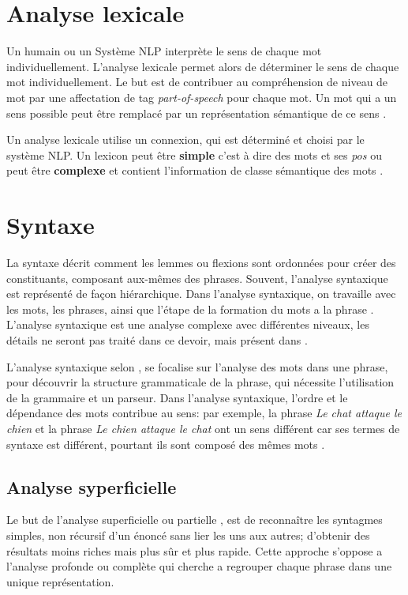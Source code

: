 \section{Analyse lexicale}
Un humain ou un Système NLP interprète le sens de chaque mot individuellement. L'analyse lexicale permet alors de déterminer le sens de chaque mot individuellement. Le but est de contribuer au compréhension de niveau de mot par une affectation de tag \textit{part-of-speech} pour chaque mot. Un mot qui a un sens possible peut être remplacé par un représentation sémantique de ce sens \citep{natural-language-processing}.

Un analyse lexicale utilise un connexion, qui est déterminé et choisi par le système NLP. Un lexicon peut être \textbf{simple} c'est à dire des mots et ses \textit{pos} ou peut être \textbf{complexe} et contient l'information de classe sémantique des mots \citep{natural-language-processing}.

\section{Syntaxe}
La syntaxe décrit comment les lemmes ou flexions sont ordonnées pour créer des constituants, composant aux-mêmes des phrases. Souvent, l'analyse syntaxique est représenté de façon hiérarchique. Dans l'analyse syntaxique, on travaille avec les mots, les phrases, ainsi que l'étape de la formation du mots a la phrase \citep{automatic-nlp}. L'analyse syntaxique est une analyse complexe avec différentes niveaux, les détails ne seront pas traité dans ce devoir, mais présent dans  \citep{automatic-nlp}.

L'analyse syntaxique selon \citeauthor{natural-language-processing}, se focalise sur l'analyse des mots dans une phrase, pour découvrir la structure grammaticale de la phrase, qui nécessite l'utilisation de la grammaire et un parseur. Dans l’analyse syntaxique, l'ordre et le dépendance des mots contribue au sens: par exemple, la phrase \textit{\og Le chat attaque le chien \fg{}} et la phrase \textit{\og Le chien attaque le chat \fg{}} ont un sens différent car ses termes de syntaxe est différent, pourtant ils sont composé des mêmes mots \citep{natural-language-processing}.

\subsection{Analyse syperficielle}
Le but de l'analyse superficielle ou partielle \citep{automatic-nlp}, est de reconnaître les syntagmes simples, non récursif d'un énoncé sans lier les uns aux autres; d'obtenir des résultats moins riches mais plus sûr et plus rapide. Cette approche s'oppose a l'analyse profonde ou complète qui cherche a regrouper chaque phrase dans une unique représentation.


